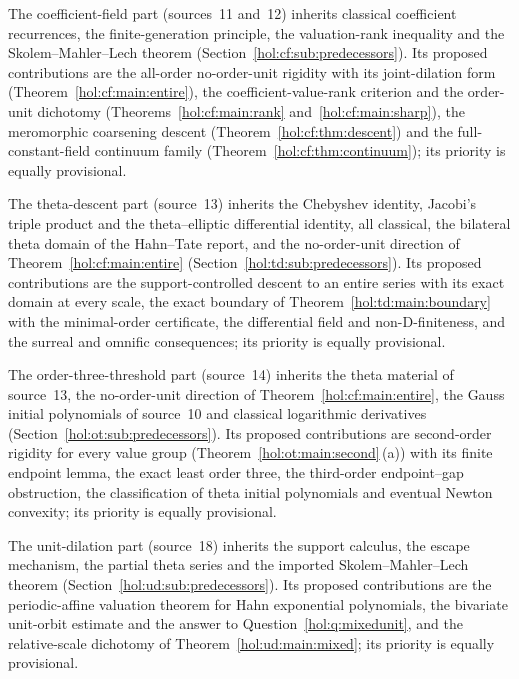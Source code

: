 \documentclass[11pt]{article}
\numberwithin{equation}{section}
\theoremstyle{definition}
\theoremstyle{remark}
\begin{document}
The coefficient-field part (sources~11 and~12) inherits classical coefficient
recurrences, the finite-generation principle, the valuation-rank inequality
and the Skolem--Mahler--Lech theorem
(Section~\ref{hol:cf:sub:predecessors}). Its proposed contributions are the
all-order no-order-unit rigidity with its joint-dilation form
(Theorem~\ref{hol:cf:main:entire}), the coefficient-value-rank criterion and
the order-unit dichotomy (Theorems~\ref{hol:cf:main:rank}
and~\ref{hol:cf:main:sharp}), the meromorphic coarsening descent
(Theorem~\ref{hol:cf:thm:descent}) and the full-constant-field continuum
family (Theorem~\ref{hol:cf:thm:continuum}); its priority is equally
provisional.

The theta-descent part (source~13) inherits the Chebyshev identity, Jacobi's
triple product and the theta--elliptic differential identity, all classical,
the bilateral theta domain of the Hahn--Tate report, and the no-order-unit
direction of Theorem~\ref{hol:cf:main:entire}
(Section~\ref{hol:td:sub:predecessors}). Its proposed contributions are the
support-controlled descent to an entire series with its exact domain at every
scale, the exact boundary of Theorem~\ref{hol:td:main:boundary} with the
minimal-order certificate, the differential field and non-D-finiteness, and
the surreal and omnific consequences; its priority is equally provisional.

The order-three-threshold part (source~14) inherits the theta material of
source~13, the no-order-unit direction of Theorem~\ref{hol:cf:main:entire},
the Gauss initial polynomials of source~10 and classical logarithmic
derivatives (Section~\ref{hol:ot:sub:predecessors}). Its proposed
contributions are second-order rigidity for every value group
(Theorem~\ref{hol:ot:main:second}\,(a)) with its finite endpoint lemma, the
exact least order three, the third-order endpoint--gap obstruction, the
classification of theta initial polynomials and eventual Newton convexity;
its priority is equally provisional.

The unit-dilation part (source~18) inherits the support calculus, the escape
mechanism, the partial theta series and the imported Skolem--Mahler--Lech
theorem (Section~\ref{hol:ud:sub:predecessors}). Its proposed contributions
are the periodic-affine valuation theorem for Hahn exponential polynomials,
the bivariate unit-orbit estimate and the answer to
Question~\ref{hol:q:mixedunit}, and the relative-scale dichotomy of
Theorem~\ref{hol:ud:main:mixed}; its priority is equally provisional.
\end{document}
